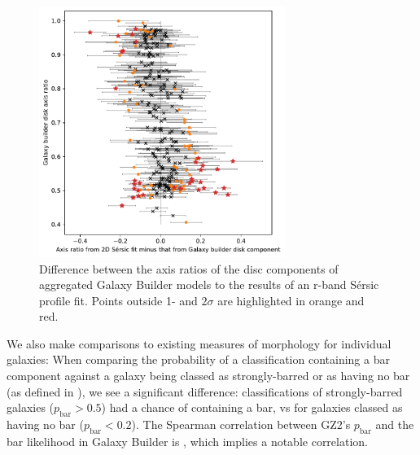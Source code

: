 \documentclass[../main.tex]{subfiles}
\begin{document}
\begin{figure}
  \includegraphics[width=8cm]{images__results/gzb-agg-nsa-comparison.pdf}
  \caption{Difference between the axis ratios of the disc components of aggregated Galaxy Builder models to the results of an r-band S\'ersic profile fit. Points outside 1- and $2\sigma$ are highlighted in orange and red.}
  \label{fig:ax_ratio_comparison}
\end{figure}

We also make comparisons to existing measures of morphology for individual galaxies: When comparing the probability of a classification containing a bar component against a galaxy being classed as strongly-barred or as having no bar (as defined in \citealt{Masters2010:1003.0449v2}), we see a significant difference: classifications of strongly-barred galaxies ($p_\text{bar} > 0.5$) had a  chance of containing a bar, vs  for galaxies classed as having no bar ($p_\text{bar} < 0.2$). The Spearman correlation between GZ2's $p_\text{bar}$ and the bar likelihood in Galaxy Builder is , which implies a notable correlation.



\end{document}
